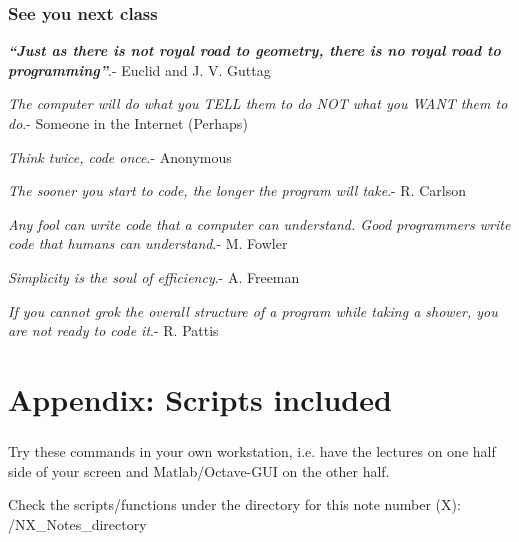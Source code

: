 \documentclass[11pt]{beamer}
\newif\ifplacelogo %
\begin{document}
\placelogotrue

\begin{frame}
\frametitle{See you next class}
\vspace{-25pt}

\textbf{\textit{``Just as there is not royal road to geometry, there is no royal road to programming''}}.- Euclid and J. V. Guttag
\vspace{7pt}

\textit{The computer will do what you TELL them to do NOT what you WANT them to do}.- Someone in the Internet (Perhaps)
\vspace{7pt}	

\textit{Think twice, code once}.- Anonymous
\vspace{7pt}

\textit{The sooner you start to code, the longer the program will take}.- R. Carlson\vspace{7pt}

\textit{Any fool can write code that a computer can understand. Good programmers write code that humans can understand}.- M. Fowler
\vspace{7pt}

\textit{Simplicity is the soul of efficiency}.- A. Freeman
\vspace{7pt}

\textit{If you cannot grok the overall structure of a program while taking a shower, you are not ready to code it}.- R. Pattis

\end{frame}

\placelogofalse

\section{Appendix: Scripts included}


\begin{frame}
\frametitle{\secname}

\vspace{-7pt}


\vspace{-7pt}
\begin{exampleblock}{}
	Try these commands in your own workstation, i.e. have the lectures on one half side of your screen and Matlab/Octave-GUI on the other half. %
\end{exampleblock}

\begin{alertblock}{}
	Check the scripts/functions under the directory for this note number (X): \newline
	/NX\_Notes\_directory
\end{alertblock}

\end{frame}	
\end{document}
